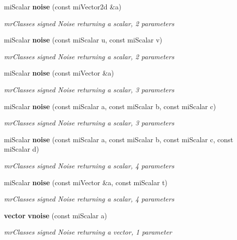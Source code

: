 \begin{CompactItemize}
mi\-Scalar {\bf noise} (const mi\-Vector2d \&a)
\begin{CompactList}\small\item\em mr\-Classes signed Noise returning a scalar, 2 parameters \item\end{CompactList}\item 
mi\-Scalar {\bf noise} (const mi\-Scalar u, const mi\-Scalar v)
\begin{CompactList}\small\item\em mr\-Classes signed Noise returning a scalar, 2 parameters \item\end{CompactList}\item 
mi\-Scalar {\bf noise} (const mi\-Vector \&a)
\begin{CompactList}\small\item\em mr\-Classes signed Noise returning a scalar, 3 parameters \item\end{CompactList}\item 
mi\-Scalar {\bf noise} (const mi\-Scalar a, const mi\-Scalar b, const mi\-Scalar c)
\begin{CompactList}\small\item\em mr\-Classes signed Noise returning a scalar, 3 parameters \item\end{CompactList}\item 
mi\-Scalar {\bf noise} (const mi\-Scalar a, const mi\-Scalar b, const mi\-Scalar c, const mi\-Scalar d)
\begin{CompactList}\small\item\em mr\-Classes signed Noise returning a scalar, 4 parameters \item\end{CompactList}\item 
mi\-Scalar {\bf noise} (const mi\-Vector \&a, const mi\-Scalar t)
\begin{CompactList}\small\item\em mr\-Classes signed Noise returning a scalar, 4 parameters \item\end{CompactList}\item 
{\bf vector} {\bf vnoise} (const mi\-Scalar a)
\begin{CompactList}\small\item\em mr\-Classes signed Noise returning a vector, 1 parameter \item\end{CompactList}\item 

\end{CompactItemize}
